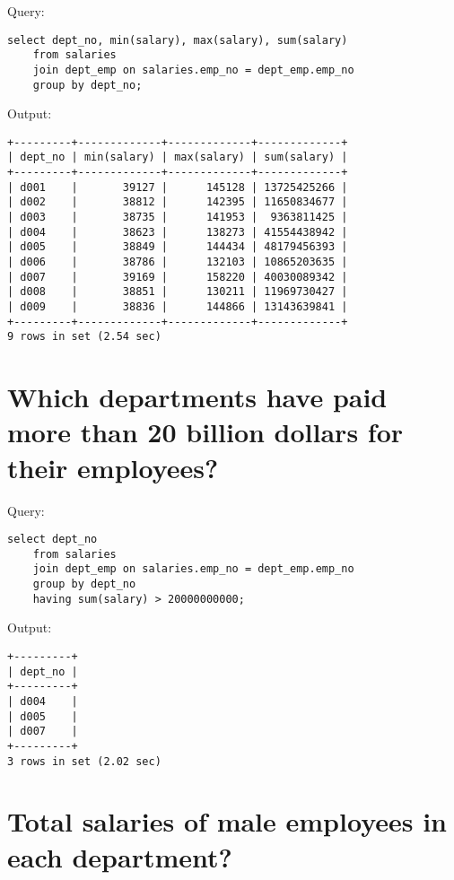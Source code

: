 \documentclass[12pt]{article}
\begin{document}
Query:

\begin{verbatim}
select dept_no, min(salary), max(salary), sum(salary)
    from salaries
    join dept_emp on salaries.emp_no = dept_emp.emp_no
    group by dept_no;
\end{verbatim}

Output:

\begin{verbatim}
+---------+-------------+-------------+-------------+
| dept_no | min(salary) | max(salary) | sum(salary) |
+---------+-------------+-------------+-------------+
| d001    |       39127 |      145128 | 13725425266 |
| d002    |       38812 |      142395 | 11650834677 |
| d003    |       38735 |      141953 |  9363811425 |
| d004    |       38623 |      138273 | 41554438942 |
| d005    |       38849 |      144434 | 48179456393 |
| d006    |       38786 |      132103 | 10865203635 |
| d007    |       39169 |      158220 | 40030089342 |
| d008    |       38851 |      130211 | 11969730427 |
| d009    |       38836 |      144866 | 13143639841 |
+---------+-------------+-------------+-------------+
9 rows in set (2.54 sec)
\end{verbatim}


\section{Which departments have paid more than 20 billion dollars for their employees?}

Query:

\begin{verbatim}
select dept_no
    from salaries
    join dept_emp on salaries.emp_no = dept_emp.emp_no
    group by dept_no
    having sum(salary) > 20000000000;
\end{verbatim}

Output:

\begin{verbatim}
+---------+
| dept_no |
+---------+
| d004    |
| d005    |
| d007    |
+---------+
3 rows in set (2.02 sec)
\end{verbatim}


\section{Total salaries of male employees in each department?}
\end{document}

